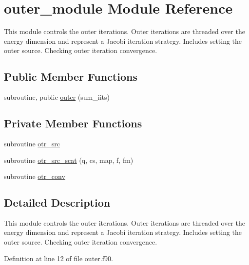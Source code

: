 \hypertarget{classouter__module}{\section{outer\-\_\-module Module Reference}
\label{classouter__module}
}


This module controls the outer iterations. Outer iterations are threaded over the energy dimension and represent a Jacobi iteration strategy. Includes setting the outer source. Checking outer iteration convergence.  


\subsection*{Public Member Functions}
\begin{DoxyCompactItemize}
\item 
subroutine, public \hyperlink{classouter__module_a2deee1d5431094eb8d9c17c09666a844}{outer} (sum\-\_\-iits)
\end{DoxyCompactItemize}
\subsection*{Private Member Functions}
\begin{DoxyCompactItemize}
\item 
subroutine \hyperlink{classouter__module_acdd24e16ca56ddbc18ced7fca3073920}{otr\-\_\-src}
\item 
subroutine \hyperlink{classouter__module_a768cdc8f62d3f03c48810935e0c7d7a6}{otr\-\_\-src\-\_\-scat} (q, cs, map, f, fm)
\item 
subroutine \hyperlink{classouter__module_a084cd5d518ac2e6f60b82677797381ca}{otr\-\_\-conv}
\end{DoxyCompactItemize}


\subsection{Detailed Description}
This module controls the outer iterations. Outer iterations are threaded over the energy dimension and represent a Jacobi iteration strategy. Includes setting the outer source. Checking outer iteration convergence. 

Definition at line 12 of file outer.\-f90.



